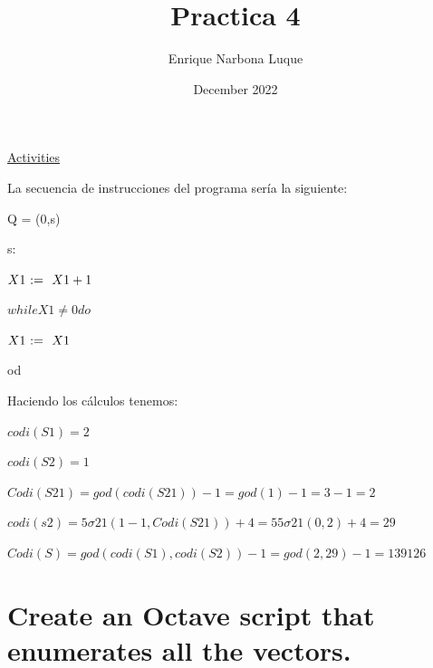 \documentclass{article}
\title{Practica 4}
\author{Enrique Narbona Luque}
\date{December 2022}
\begin{document}
\maketitle\LARGE{\underline{Activities}}

\vspace{4mm}


\vspace{5mm}

\normalsize

La secuencia de instrucciones del programa sería la siguiente:

\vspace{3mm}

Q = (0,s)

s:

$ X1 \Assig X1 + 1 $

$ while X1 \not = 0 do $

$ X1 \Assig X1 $

od

\vspace{5mm}

Haciendo los cálculos tenemos:

\vspace{2mm}

$codi(S1) = 2$

$codi(S2) = 1$

$Codi(S21) = god (codi(S21)) - 1 = god(1) - 1 = 3 - 1 = 2$

$codi(s2) = 5\sigma21(1-1,Codi(S21)) + 4 = 5 5\sigma21(0,2) + 4 = 29$

$Codi(S) = god(codi(S1),codi(S2)) - 1 = god(2,29) - 1 = 139126$

\newpage

\large{\section{Create an Octave script that enumerates all the vectors.}}

 \vspace{5mm}

\end{document}
